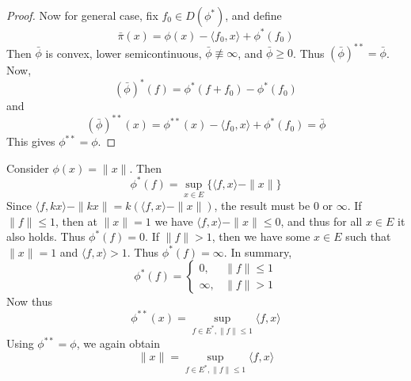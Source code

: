 \begin{proof}
Now for general case, fix $f_0\in D(\phi^*)$, and define
\begin{equation}
\bar{\pi}(x)=\phi(x)-\langle f_0,x\rangle+\phi^*(f_0)
\end{equation}
Then $\bar{\phi}$ is convex, lower semicontinuous, $\bar{\phi}\not\equiv \infty$, and $\bar{\phi}\geq 0$. Thus $(\bar{\phi})^{**}=\bar{\phi}$. Now,
\begin{equation}
(\bar{\phi})^*(f)=\phi^*(f+f_0)-\phi^*(f_0)
\end{equation}
and
\begin{equation}
(\bar{\phi})^{**}(x)=\phi^{**}(x)-\langle f_0,x\rangle+\phi^*(f_0)=\bar{\phi}
\end{equation}
This gives $\phi^{**}=\phi$.
\end{proof}

\begin{exmp} Consider $\phi(x)=\|x\|$. Then
\begin{equation}
\phi^*(f)=\sup_{x\in E}\{\langle f,x\rangle-\|x\|\}
\end{equation}
Since $\langle f,kx\rangle-\|kx\|=k(\langle f,x\rangle-\|x\|)$, the result must be $0$ or $\infty$. If $\|f\|\leq 1$, then at $\|x\|=1$ we have $\langle f,x\rangle-\|x\|\leq 0$, and thus for all $x\in E$ it also holds. Thus $\phi^*(f)=0$. If $\|f\|>1$, then we have some $x\in E$ such that $\|x\|=1$ and $\langle f,x\rangle>1$. Thus $\phi^*(f)=\infty$. In summary,
\begin{equation}
\phi^*(f)=\begin{cases}0,&\|f\|\leq 1\\
\infty,&\|f\|>1
\end{cases}
\end{equation}
Now thus
\begin{equation}
\phi^{**}(x)=\sup_{f\in E^*,\|f\|\leq 1}\langle f,x\rangle
\end{equation}
Using $\phi^{**}=\phi$, we again obtain
\begin{equation}
\|x\|=\sup_{f\in E^*,\|f\|\leq 1}\langle f,x\rangle
\end{equation}
\end{exmp}

